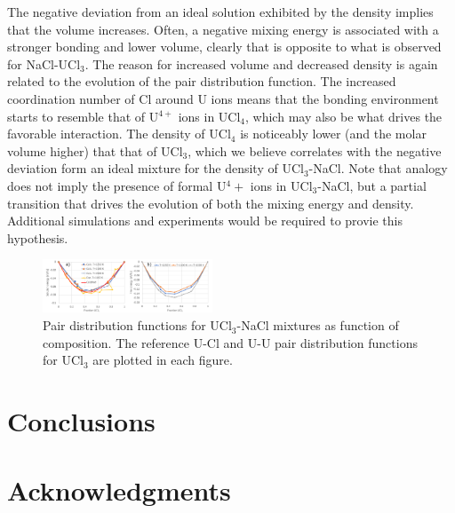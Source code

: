 \documentclass[preprint,3p,10pt,twocolumn,number,sort&compress]{elsarticle}
\begin{document}
The negative deviation from an ideal solution exhibited by the density implies that the volume increases. Often, a negative mixing energy is associated with a stronger bonding and lower volume, clearly that is opposite to what is observed for NaCl-UCl$_3$. The reason for increased volume and decreased density is again related to the evolution of the pair distribution function. The increased coordination number of Cl around U ions means that the bonding environment starts to resemble that of U$^{4+}$ ions in UCl$_4$, which may also be what drives the favorable interaction. The density of UCl$_4$ is noticeably lower (and the molar volume higher) that that of UCl$_3$, which we believe correlates with the negative deviation form an ideal mixture for the density of UCl$_3$-NaCl. Note that analogy does not imply the presence of formal U$^4+$ ions in UCl$_3$-NaCl, but a partial transition that drives the evolution of both the mixing energy and density. Additional simulations and experiments would be required to provie this hypothesis.

 \begin{figure}[htb]
\centering
\includegraphics[width=0.45\textwidth]{./figures/FIG7.pdf}
\caption{Pair distribution functions for UCl$_3$-NaCl mixtures as function of composition. The reference U-Cl and U-U pair distribution functions for UCl$_3$ are plotted in each figure.} 
\label{fig:fig_pair}
\end{figure}



\section{Conclusions}
\label{sec:conclusions}


\section{Acknowledgments}





\end{document}
